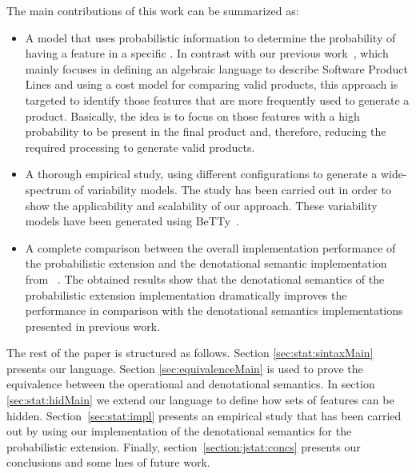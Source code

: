 The main contributions of this work can be summarized as:

\begin{itemize}

	\item 
	
	A model that uses probabilistic information to determine the probability of having a feature in a specific \SPL. In contrast with our previous work~\cite{acl13,clc16}, which mainly focuses in defining an algebraic language to describe Software Product Lines and using a cost model for comparing valid products, this approach is targeted to identify those features that are more frequently used to generate a product. Basically, the idea is to focus on those features with a high probability to be present in the final product and, therefore, reducing the required processing to generate valid products. 
		
	\item  A thorough empirical study, using different configurations to generate a wide-spectrum of variability models. The  study has been carried out in order to show the applicability and scalability of our approach. These variability models have been generated using BeTTy~\cite{SeguraHBC11}.
	
	\item A complete comparison between the overall implementation performance of the probabilistic extension and the denotational semantic implementation from \fodaPA~\cite{acl13}. The obtained results show that the denotational semantics of the probabilistic extension implementation dramatically improves the performance
in comparison with the denotational semantics implementations presented in previous work.

\end{itemize}


The rest of the paper is structured as follows. Section \ref{sec:stat:sintaxMain} presents our language. Section \ref{sec:equivalenceMain} is used to prove the equivalence between the operational and denotational semantics. In section \ref{sec:stat:hidMain} we extend our language to define how sets of features can be hidden. Section~\ref{sec:stat:impl} presents an empirical study that has been carried out by using our implementation of the denotational semantics for the probabilistic extension. Finally, section~\ref{section:jstat:concs} presents our conclusions and some lnes of future work.





